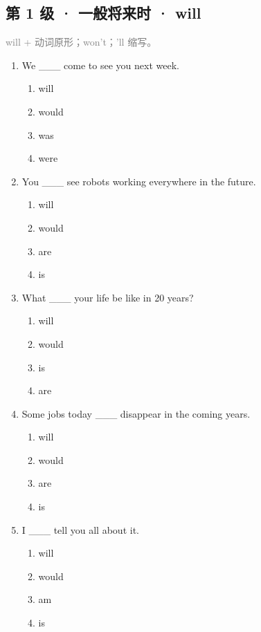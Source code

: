 \documentclass[11pt,a4paper]{ctexart}
\begin{document}
\subsection*{第 1 级 · 一般将来时 · will}
\noindent\textcolor{gray}{will + 动词原形；won’t；’ll 缩写。}\par\smallskip
\begin{enumerate}[leftmargin=*,itemsep=4pt]
\item We \_\_\_ come to see you next week.
\begin{enumerate}[label=\Alph*.,leftmargin=2em,itemsep=1pt,topsep=2pt]
\item will
\item would
\item was
\item were
\end{enumerate}
\item You \_\_\_ see robots working everywhere in the future.
\begin{enumerate}[label=\Alph*.,leftmargin=2em,itemsep=1pt,topsep=2pt]
\item will
\item would
\item are
\item is
\end{enumerate}
\item What \_\_\_ your life be like in 20 years?
\begin{enumerate}[label=\Alph*.,leftmargin=2em,itemsep=1pt,topsep=2pt]
\item will
\item would
\item is
\item are
\end{enumerate}
\item Some jobs today \_\_\_ disappear in the coming years.
\begin{enumerate}[label=\Alph*.,leftmargin=2em,itemsep=1pt,topsep=2pt]
\item will
\item would
\item are
\item is
\end{enumerate}
\item I \_\_\_ tell you all about it.
\begin{enumerate}[label=\Alph*.,leftmargin=2em,itemsep=1pt,topsep=2pt]
\item will
\item would
\item am
\item is

\end{enumerate}
\end{enumerate}
\end{document}

